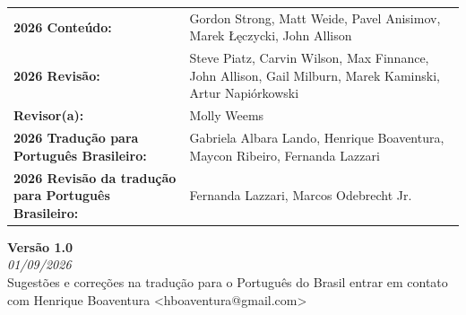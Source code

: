 \begin{titlepage}
        \begin{tabular}{ p{6.5cm} p{11.5cm} }
            \textbf{2026 Conteúdo:}	& Gordon Strong, Matt Weide, Pavel Anisimov, Marek Łęczycki, John Allison \\
            \textbf{2026 Revisão:} & Steve Piatz, Carvin Wilson, Max Finnance, John Allison, Gail Milburn, Marek Kaminski, Artur Napiórkowski \\
            \textbf{Revisor(a):} & Molly Weems \\
            \textbf{2026 Tradução para Português Brasileiro:} & Gabriela Albara Lando, Henrique Boaventura, Maycon Ribeiro, Fernanda Lazzari  \\
            \textbf{2026 Revisão da tradução para Português Brasileiro:} & Fernanda Lazzari, Marcos Odebrecht Jr.
        \end{tabular}
        \vspace{0.5cm}
        \textbf{Versão 1.0}\\
        \footnotesize{\textit{01/09/2026}}\\
        \vspace{0.4cm}
        \footnotesize{Sugestões e correções na tradução para o Português do Brasil entrar em contato com Henrique Boaventura <hboaventura@gmail.com>}

\end{titlepage}
